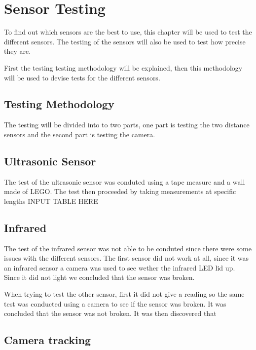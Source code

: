\section{Sensor Testing}
To find out which sensors are the best to use, this chapter will be used to test
the different sensors. The testing of the sensors will also be used to test how
precise they are.\nl

First the testing testing methodology will be explained, then this methodology
will be used to devise tests for the different sensors. 

\subsection{Testing Methodology}
The testing will be divided into to two parts, one part is testing the two
distance sensors and the second part is testing the camera. 

\subsection{Ultrasonic Sensor}
The test of the ultrasonic sensor was conduted using a tape measure and a wall
made of LEGO. The test then proceeded by taking measurements at specific
lengths 
{INPUT TABLE HERE}

\subsection{Infrared}
The test of the infrared sensor was not able to be conduted since there were
some issues with the different sensors. The first sensor did not work at all,
since it was an infrared sensor a camera was used to see wether the infrared LED
lid up. Since it did not light we concluded that the sensor was broken. \nl

When trying to test the other sensor, first it did not give a reading so the
same test was conducted using a camera to see if the sensor was broken. It was
concluded that the sensor was not broken. It was then discovered that 

\subsection{Camera tracking}%